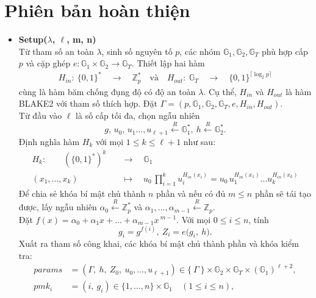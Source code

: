 \documentclass[class=report, crop=false]{standalone}
\begin{document}
	\section{Phiên bản hoàn thiện}
		\begin{itemize}[leftmargin=1cm, itemindent=-1cm]
			\item[] {\sffamily\bfseries Setup($\lambda$, $\ell$, m, n)} \\
			Từ tham số an toàn $\lambda$, sinh số nguyên tố $p$, các nhóm $\mathbb{G}_1, \mathbb{G}_2, \mathbb{G}_T$ phù hợp cấp $p$ và cặp ghép $e: \mathbb{G}_1 \times \mathbb{G}_2 \rightarrow \mathbb{G}_T$. Thiết lập hai hàm
			\begin{align*}
				H_{in}: 	\ \{0, 1 \}^* 	\quad \rightarrow \quad \mathbb{Z}_p^* 						\quad \text{và}\quad
				H_{out}: 	\ \mathbb{G}_T 	\quad \rightarrow \quad \{0, 1 \}^{\lceil \log_2 p \rceil}
			\end{align*}
			cùng là hàm băm chống đụng độ có độ an toàn $\lambda$. Cụ thể, $H_{in}$ và $H_{out}$ là hàm BLAKE2 với tham số thích hợp. Đặt $\Gamma = (p, \mathbb{G}_1, \mathbb{G}_2, \mathbb{G}_T, e, H_{in}, H_{out})$. \\
			Từ đầu vào $\ell$ là số cấp tối đa, chọn ngẫu nhiên
			\[
				g,\, u_0,\, u_1 \dots, u_{\ell + 1} \xleftarrow{R} \mathbb{G}_1^*,\ h \xleftarrow{R} \mathbb{G}_2^*.
			\]
			Định nghĩa hàm $H_k$ với mọi $1 \leq k \leq \ell + 1$ như sau:
			\begin{align*}
				H_k:\quad\quad 	(\{0, 1 \}^*)^k 	\quad	 &\rightarrow 	\quad  	\mathbb{G}_1 \\
								(x_1, \dots, x_k) 	\quad	 &\mapsto 		\quad  	u_0 \, \prod_{i = 1}^k u_i^{H_{in}(x_i)} = u_0 \, u_1^{H_{in}(x_1)}\dots u_k^{H_{in}(x_k)}
			\end{align*}
			Để chia sẻ khóa bí mật chủ thành $n$ phần và nếu có đủ $m \leq n$ phần sẽ tái tạo được, lấy ngẫu nhiên $\alpha_0 \xleftarrow{R} \mathbb{Z}_p^*$ và $\alpha_1, \dots, \alpha_{m - 1} \xleftarrow{R} \mathbb{Z}_p$. \\
			Đặt $f(x) = \alpha_0 + \alpha_1x + \dots + \alpha_{m - 1}x\,^{m - 1}$. Với mọi $0 \leq i \leq n$, tính
			\[
				g_i = g^{f(i)},\ Z_i = e \Big(g_i,\ h \Big).
			\]
			Xuất ra tham số công khai, các khóa bí mật chủ thành phần và khóa kiểm tra:
			\begin{align*}
				params &= (\Gamma,\ h,\ Z_0,\ u_0, \dots, u_{\ell + 1}) \in \{\ \Gamma \ \} \times \mathbb{G}_2 \times \mathbb{G}_T \times (\mathbb{G}_1)^{\ell + 2}, \\
				pmk_i &= (i,\ g_i) \in \{1, \dots, n \} \times \mathbb{G}_1 \quad (1 \leq i \leq n), \\

\end{align*}
\end{itemize}
\end{document}
